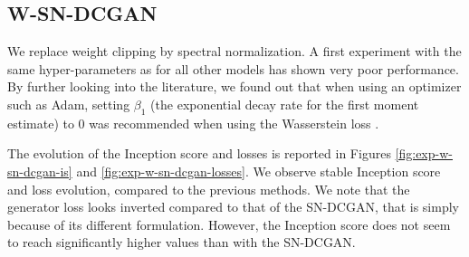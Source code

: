 \subsection{W-SN-DCGAN}
\label{sec:exp-wsndcgan}
We replace weight clipping by spectral normalization. A first experiment with the same hyper-parameters as for all other models has shown very poor performance. By further looking into the literature, we found out that when using an optimizer such as Adam, setting $\beta_1$ (the exponential decay rate for the first moment estimate) to 0 was recommended when using the Wasserstein loss \cite{arjovsky2017wasserstein}.

The evolution of the Inception score and losses is reported in Figures \ref{fig:exp-w-sn-dcgan-is} and \ref{fig:exp-w-sn-dcgan-losses}. We observe stable Inception score and loss evolution, compared to the previous methods. We note that the generator loss looks inverted compared to that of the SN-DCGAN, that is simply because of its different formulation. However, the Inception score does not seem to reach significantly higher values than with the SN-DCGAN.

